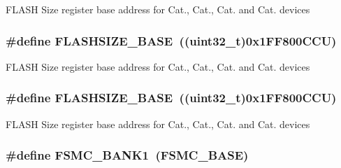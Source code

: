 F\-L\-A\-S\-H Size register base address for Cat., Cat., Cat. and Cat. devices \hypertarget{group___peripheral__memory__map_ga776d985f2d4d40b588ef6ca9d573af78}{
\subsubsection[{F\-L\-A\-S\-H\-S\-I\-Z\-E\-\_\-\-B\-A\-S\-E}]{\setlength{\rightskip}{0pt plus 5cm}\#define F\-L\-A\-S\-H\-S\-I\-Z\-E\-\_\-\-B\-A\-S\-E~((uint32\-\_\-t)0x1\-F\-F800\-C\-C\-U)}}\label{group___peripheral__memory__map_ga776d985f2d4d40b588ef6ca9d573af78}
F\-L\-A\-S\-H Size register base address for Cat., Cat., Cat. and Cat. devices \hypertarget{group___peripheral__memory__map_ga776d985f2d4d40b588ef6ca9d573af78}{
\subsubsection[{F\-L\-A\-S\-H\-S\-I\-Z\-E\-\_\-\-B\-A\-S\-E}]{\setlength{\rightskip}{0pt plus 5cm}\#define F\-L\-A\-S\-H\-S\-I\-Z\-E\-\_\-\-B\-A\-S\-E~((uint32\-\_\-t)0x1\-F\-F800\-C\-C\-U)}}\label{group___peripheral__memory__map_ga776d985f2d4d40b588ef6ca9d573af78}
F\-L\-A\-S\-H Size register base address for Cat., Cat., Cat. and Cat. devices \hypertarget{group___peripheral__memory__map_gad9f1205bd4a5a87047167cfd08c621be}{
\subsubsection[{F\-S\-M\-C\-\_\-\-B\-A\-N\-K1}]{\setlength{\rightskip}{0pt plus 5cm}\#define F\-S\-M\-C\-\_\-\-B\-A\-N\-K1~({\bf F\-S\-M\-C\-\_\-\-B\-A\-S\-E})}}\label{group___peripheral__memory__map_gad9f1205bd4a5a87047167cfd08c621be}
